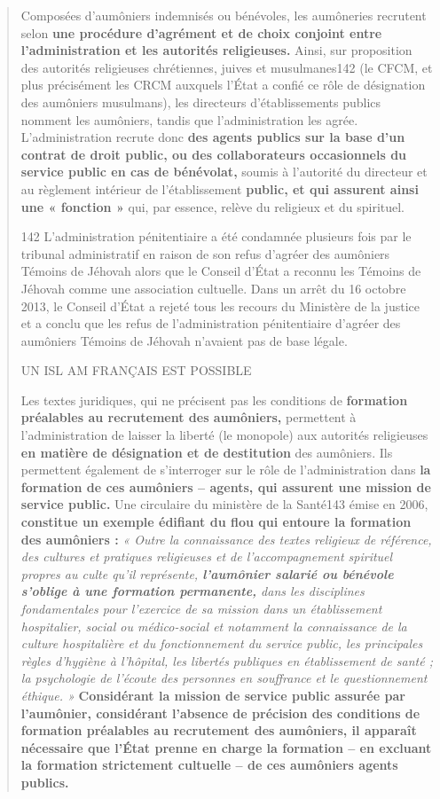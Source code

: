 \begin{quote}
Composées d'aumôniers indemnisés ou bénévoles, les aumôneries recrutent
selon \textbf{une procédure d'agrément et de choix conjoint entre
l'administration et les autorités religieuses.} Ainsi, sur proposition
des autorités religieuses chrétiennes, juives et musulmanes142 (le CFCM,
et plus précisément les CRCM auxquels l'État a confié ce rôle de
désignation des aumôniers musulmans), les directeurs d'établissements
publics nomment les aumôniers, tandis que l'administration les agrée.
L'administration recrute donc \textbf{des agents publics sur la base
d'un contrat de droit public, ou des collaborateurs occasionnels du
service public en cas de bénévolat,} soumis à l'autorité du directeur et
au règlement intérieur de l'établissement \textbf{public, et qui
assurent ainsi une « fonction »} qui, par essence, relève du religieux
et du spirituel.

142 L'administration pénitentiaire a été condamnée plusieurs fois par le
tribunal administratif en raison de son refus d'agréer des aumôniers
Témoins de Jéhovah alors que le Conseil d'État a reconnu les Témoins de
Jéhovah comme une association cultuelle. Dans un arrêt du 16 octobre
2013, le Conseil d'État a rejeté tous les recours du Ministère de la
justice et a conclu que les refus de l'administration pénitentiaire
d'agréer des aumôniers Témoins de Jéhovah n'avaient pas de base légale.

UN ISL AM FRANÇAIS EST POSSIBLE

Les textes juridiques, qui ne précisent pas les conditions de
\textbf{formation préalables au recrutement des aumôniers,} permettent à
l'administration de laisser la liberté (le monopole) aux autorités
religieuses \textbf{en matière de désignation et de destitution} des
aumôniers. Ils permettent également de s'interroger sur le rôle de
l'administration dans \textbf{la formation de ces aumôniers -- agents,
qui assurent une mission de service public.} Une circulaire du ministère
de la Santé143 émise en 2006, \textbf{constitue un exemple édifiant du
flou qui entoure la formation des aumôniers :} \emph{« Outre la
connaissance des textes religieux de référence, des cultures et
pratiques religieuses et de l'accompagnement spirituel propres au culte
qu'il représente, \textbf{l'aumônier salarié ou bénévole s'oblige à une
formation permanente,} dans les disciplines fondamentales pour
l'exercice de sa mission dans un établissement hospitalier, social ou
médico-social et notamment la connaissance de la culture hospitalière et
du fonctionnement du service public, les principales règles d'hygiène à
l'hôpital, les libertés publiques en établissement de santé ; la
psychologie de l'écoute des personnes en souffrance et le questionnement
éthique. »} \textbf{Considérant la mission de service public assurée par
l'aumônier, considérant l'absence de précision des conditions de
formation préalables au recrutement des aumôniers, il apparaît
nécessaire que l'État prenne en charge la formation -- en excluant la
formation strictement cultuelle -- de ces aumôniers agents publics.}
\end{quote}

